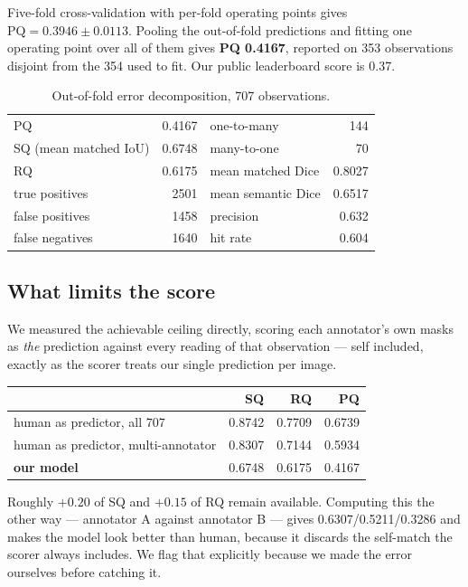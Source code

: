 Five-fold cross-validation with per-fold operating points gives
$\mathrm{PQ} = 0.3946 \pm 0.0113$. Pooling the out-of-fold predictions and
fitting one operating point over all of them gives \textbf{PQ 0.4167},
reported on 353 observations disjoint from the 354 used to fit. Our public
leaderboard score is 0.37.

\begin{table}[t]
\centering
\caption{Out-of-fold error decomposition, 707 observations.}
\begin{tabular}{lr@{\hskip 2em}lr}
\toprule
PQ & 0.4167 & one-to-many & 144 \\
SQ (mean matched IoU) & 0.6748 & many-to-one & 70 \\
RQ & 0.6175 & mean matched Dice & 0.8027 \\
true positives & 2501 & mean semantic Dice & 0.6517 \\
false positives & 1458 & precision & 0.632 \\
false negatives & 1640 & hit rate & 0.604 \\
\bottomrule
\end{tabular}
\end{table}

\subsection{What limits the score}

We measured the achievable ceiling directly, scoring each annotator's own masks
as \emph{the} prediction against every reading of that observation --- self
included, exactly as the scorer treats our single prediction per image.

\begin{center}
\begin{tabular}{lrrr}
\toprule
& SQ & RQ & PQ \\
\midrule
human as predictor, all 707 & 0.8742 & 0.7709 & 0.6739 \\
human as predictor, multi-annotator & 0.8307 & 0.7144 & 0.5934 \\
\textbf{our model} & 0.6748 & 0.6175 & 0.4167 \\
\bottomrule
\end{tabular}
\end{center}

Roughly $+0.20$ of SQ and $+0.15$ of RQ remain available. Computing this the
other way --- annotator A against annotator B --- gives 0.6307/0.5211/0.3286 and
makes the model look better than human, because it discards the self-match the
scorer always includes. We flag that explicitly because we made the error
ourselves before catching it.

